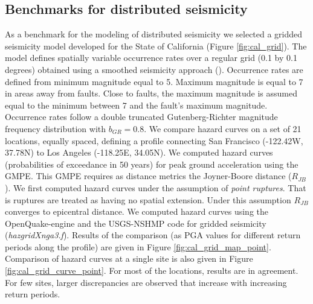 \subsection{Benchmarks for distributed seismicity}
As a benchmark for the modeling of distributed seismicity we selected a gridded seismicity model developed for the State of California (Figure \ref{fig:cal_grid}). The model defines spatially variable occurrence rates over a regular grid (0.1 by 0.1 degrees) obtained using a smoothed seismicity approach (\cite{frankel1995}). Occurrence rates are defined from minimum magnitude equal to 5. Maximum magnitude is equal to 7 in areas away from faults. Close to faults, the maximum magnitude is assumed equal to the minimum between 7 and the fault's maximum magnitude. Occurrence rates follow a double truncated Gutenberg-Richter magnitude frequency distribution with $b_{GR} = 0.8$. We compare hazard curves on a set of 21 locations, equally spaced, defining a profile connecting San Francisco (-122.42W, 37.78N) to Los Angeles (-118.25E, 34.05N). We computed hazard curves (probabilities of exceedance in 50 years) for peak ground acceleration using the \cite{boore2008} GMPE. This GMPE requires as distance metrics the Joyner-Boore distance ($R_{JB}$). We first computed hazard curves under the assumption of \textit{point ruptures}. That is ruptures are treated as having no spatial extension. Under this assumption $R_{JB}$ converges to epicentral distance.
We computed hazard curves using the OpenQuake-engine and the USGS-NSHMP code for gridded seismicity (\textit{hazgridXnga3.f}). Results of the comparison (as PGA values for different return periods along the profile) are given in Figure \ref{fig:cal_grid_map_point}. Comparison of hazard curves at a single site is also given in Figure \ref{fig:cal_grid_curve_point}. For most of the locations, results are in agreement. For few sites, larger discrepancies are observed that increase with increasing return periods.\\

